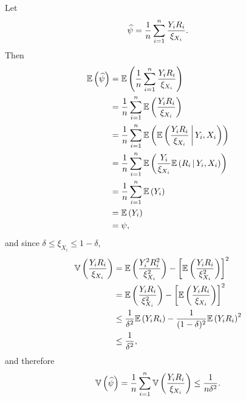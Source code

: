 \begin{ex}
  Let
  \[
    \widehat{\psi}=\frac{1}{n}\sum_{i=1}^n\frac{Y_iR_i}{\xi_{X_i}}.
  \]
  Then
  \begin{align*}
    \mathbb{E}\left(\widehat{\psi}\right)
     & =\mathbb{E}\left(\frac{1}{n}\sum_{i=1}^n\frac{Y_iR_i}{\xi_{X_i}}\right)               \\
     & =\frac{1}{n}\sum_{i=1}^n\mathbb{E}\left(\frac{Y_iR_i}{\xi_{X_i}}\right)               \\
     & =\frac{1}{n}\sum_{i=1}^n\mathbb{E}\left(\mathbb{E}\left(\frac{Y_iR_i}{\xi_{X_i}} \,\middle|\, Y_i,X_i\right)\right) \\
     & =\frac{1}{n}\sum_{i=1}^n\mathbb{E}\left(\frac{Y_i}{\xi_{X_i}}\mathbb{E}\left(R_i \,\middle|\, Y_i,X_i\right)\right) \\
     & =\frac{1}{n}\sum_{i=1}^n\mathbb{E}\left(Y_i\right)                                    \\
     & =\mathbb{E}\left(Y_i\right)                                                           \\
     & =\psi,
  \end{align*}
  and since $\delta\leq \xi_{X_i}\leq 1-\delta$,
  \begin{align*}
    \mathbb{V}\left(\frac{Y_iR_i}{\xi_{X_i}}\right)
     & =\mathbb{E}\left(\frac{Y_i^2R_i^2}{\xi^2_{X_i}}\right)
    -\left[\mathbb{E}\left(\frac{Y_iR_i}{\xi^2_{X_i}}\right)\right]^2 \\
     & =\mathbb{E}\left(\frac{Y_iR_i}{\xi^2_{X_i}}\right)
    -\left[\mathbb{E}\left(\frac{Y_iR_i}{\xi_{X_i}}\right)\right]^2   \\
     & \leq\frac{1}{\delta^2}\mathbb{E}\left(Y_iR_i\right)
    -\frac{1}{(1-\delta)^2}\mathbb{E}\left(Y_iR_i\right)^2            \\
     & \leq\frac{1}{\delta^2},
  \end{align*}
  and therefore
  \[
    \mathbb{V}\left(\widehat{\psi}\right)
    =\frac{1}{n}\sum_{i=1}^n\mathbb{V}\left(\frac{Y_iR_i}{\xi_{X_i}}\right)
    \leq\frac{1}{n\delta^2}.
  \]
\end{ex}

